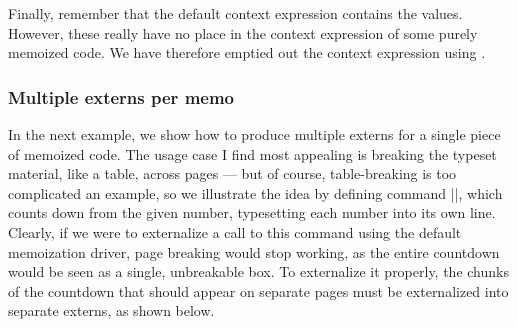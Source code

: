 \documentclass[a4paper,11pt]{article}
\begin{document}
Finally, remember that the default context expression contains the
 values.  However, these really have no place in the context
expression of some purely memoized code.  We have therefore emptied out the
context expression using .


\subsubsection{Multiple externs per memo}
\label{sec:memoization-multiple-externs}

In the next example, we show how to produce multiple externs for a single piece
of memoized code.  The usage case I find most appealing is breaking the typeset
material, like a table, across pages --- but of course, table-breaking is too
complicated an example, so we illustrate the idea by defining command
|\countdown|, which counts down from the given number, typesetting each number
into its own line.  Clearly, if we were to externalize a call to this command
using the default memoization driver, page breaking would stop working, as the
entire countdown would be seen as a single, unbreakable box.  To externalize it
properly, the chunks of the countdown that should appear on separate pages must
be externalized into separate externs, as shown below.

\end{document}
